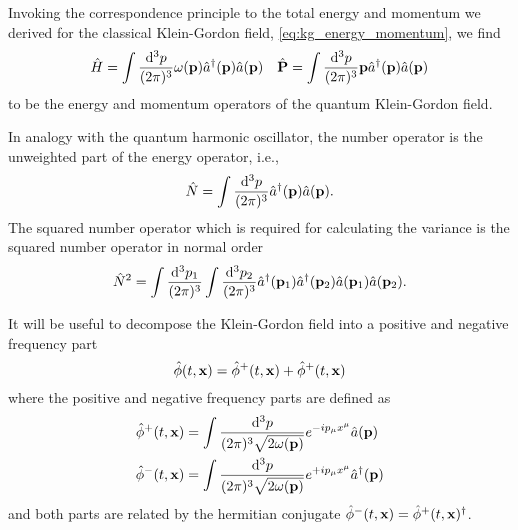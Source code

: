 \begin{lemma}
	Invoking the correspondence principle to the total energy and momentum we derived for the classical Klein-Gordon field, \cref{eq:kg_energy_momentum}, we find
	\begin{align}
		\hat{H}
		=
		\int\frac{\dd[3]{p}}{(2\pi)^3}
		\omega(\vb{p})\hat{a}^\dagger(\vb{p})\hat{a}(\vb{p})
		&&
		\hat{\vb{P}}
		=
		\int\frac{\dd[3]{p}}{(2\pi)^3}
		\vb{p}\hat{a}^\dagger(\vb{p})\hat{a}(\vb{p})
		\label{eq:qkg_energy_momentum}
	\end{align}
	to be the energy and momentum operators of the quantum Klein-Gordon field.
\end{lemma}
\begin{corollary}
	In analogy with the quantum harmonic oscillator, the number operator is the unweighted part of the energy operator, i.e.,
	\begin{equation}
		\hat{N}
		=
		\int\frac{\dd[3]{p}}{(2\pi)^3}
		\hat{a}^\dagger(\vb{p})
		\hat{a}(\vb{p})
		\label{eq:qkg_number}
		.
	\end{equation}
	The squared number operator which is required for calculating the variance is the squared number operator in normal order~\cite{Barnett2002}
	\begin{equation}
		\hat{N}^2
		=
		\int\frac{\dd[3]{p_1}}{(2\pi)^3}
		\int\frac{\dd[3]{p_2}}{(2\pi)^3}
		\hat{a}^\dagger(\vb{p}_1)
		\hat{a}^\dagger(\vb{p}_2)
		\hat{a}(\vb{p}_1)
		\hat{a}(\vb{p}_2)
		.
	\end{equation}
\end{corollary}

\begin{definition}
	It will be useful to decompose the Klein-Gordon field into a positive and negative frequency part
	\begin{equation}
		\hat\phi(t,\vb{x})
		=
		\hat\phi^+(t,\vb{x})
		+
		\hat\phi^+(t,\vb{x})
	\end{equation}
	where the positive and negative frequency parts are defined as~\cite[p.~26]{Peskin1995}
	\begin{equation}
		\begin{split}
			\hat\phi^+(t,\vb{x})
			&=
			\int\frac{\dd[3]{p}}{(2\pi)^3\sqrt{2\omega(\vb{p})}}
			e^{-ip_\mu x^\mu}
			\hat{a}(\vb{p})
			\\
			\hat\phi^-(t,\vb{x})
			&=
			\int\frac{\dd[3]{p}}{(2\pi)^3\sqrt{2\omega(\vb{p})}}
			e^{+ip_\mu x^\mu}
			\hat{a}^\dagger(\vb{p})
		\end{split}
		\label{eq:qkg_positive_negative_frequency}
	\end{equation}
	and both parts are related by the hermitian conjugate $\hat\phi^-(t,\vb{x})=\hat\phi^+(t,\vb{x})^\dagger$.
\end{definition}
